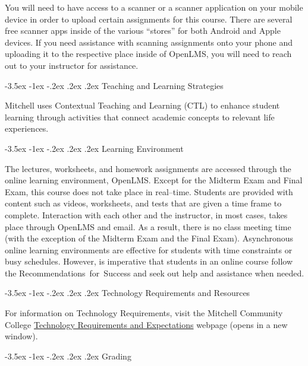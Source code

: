 \documentclass{article}
\makeatletter
\renewcommand\section{\@startsection{section}{1}{0pt}%
  {-3.5ex \@plus -1ex \@minus -.2ex}%
  {.2ex \@plus.2ex}%
  {\normalfont\Large\bfseries}} %
\makeatother
\begin{document}
You will need to have access to a scanner or a scanner application on your mobile device in order to upload certain assignments for this course. There are several free scanner apps inside of the various ``stores'' for both Android and Apple devices. If you need assistance with scanning assignments onto your phone and uploading it to the respective place inside of OpenLMS, you will need to reach out to your instructor for assistance.

\section{Teaching and Learning Strategies}

Mitchell uses Contextual Teaching and Learning (CTL) to enhance student learning through activities that connect academic concepts to relevant life experiences.

\section{Learning Environment}

The lectures, worksheets, and homework assignments are accessed through the online learning environment, OpenLMS. Except for the Midterm Exam and Final Exam, this course does not take place in real--time. Students are provided with content such as videos, worksheets, and tests that are given a time frame to complete. Interaction with each other and the instructor, in most cases, takes place through OpenLMS and email. As a result, there is no class meeting time (with the exception of the Midterm Exam and the Final Exam). Asynchronous online learning environments are effective for students with time constraints or busy schedules. However, is imperative that students in an online course follow the Recommendations~for~Success and seek out help and assistance when needed.

\section{Technology Requirements and Resources}

For information on Technology Requirements, visit the Mitchell Community College \href{https://www.mitchellcc.edu/college-credit-online-classes/\#online-learning}{Technology Requirements and Expectations} webpage (opens in a new window).

\section{Grading}
\end{document}

